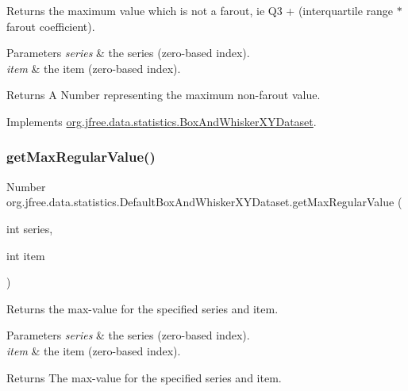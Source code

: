 Returns the maximum value which is not a farout, ie Q3 + (interquartile range $\ast$ farout coefficient).


\begin{DoxyParams}{Parameters}
{\em series} & the series (zero-\/based index). \\
\hline
{\em item} & the item (zero-\/based index).\\
\hline
\end{DoxyParams}
\begin{DoxyReturn}{Returns}
A {\ttfamily Number} representing the maximum non-\/farout value. 
\end{DoxyReturn}


Implements \mbox{\hyperlink{interfaceorg_1_1jfree_1_1data_1_1statistics_1_1_box_and_whisker_x_y_dataset_a6591ebc4568691272437f1743610780d}{org.\+jfree.\+data.\+statistics.\+Box\+And\+Whisker\+X\+Y\+Dataset}}.

\mbox{\label{classorg_1_1jfree_1_1data_1_1statistics_1_1_default_box_and_whisker_x_y_dataset_a67ab411220452537047ac852330bd0c0}} 
\subsubsection{\texorpdfstring{get\+Max\+Regular\+Value()}{getMaxRegularValue()}}
{\footnotesize\ttfamily Number org.\+jfree.\+data.\+statistics.\+Default\+Box\+And\+Whisker\+X\+Y\+Dataset.\+get\+Max\+Regular\+Value (\begin{DoxyParamCaption}\item[{int}]{series,  }\item[{int}]{item }\end{DoxyParamCaption})}

Returns the max-\/value for the specified series and item.


\begin{DoxyParams}{Parameters}
{\em series} & the series (zero-\/based index). \\
\hline
{\em item} & the item (zero-\/based index).\\
\hline
\end{DoxyParams}
\begin{DoxyReturn}{Returns}
The max-\/value for the specified series and item. 
\end{DoxyReturn}


